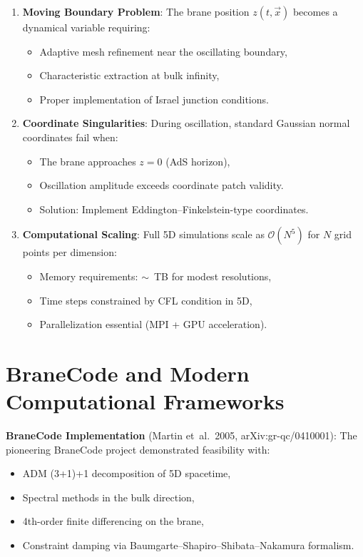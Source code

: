 \begin{enumerate}
  \item \textbf{Moving Boundary Problem}: The brane position $z(t,\vec{x})$ becomes a dynamical variable requiring:
  \begin{itemize}
    \item Adaptive mesh refinement near the oscillating boundary,
    \item Characteristic extraction at bulk infinity,
    \item Proper implementation of Israel junction conditions.
  \end{itemize}

  \item \textbf{Coordinate Singularities}: During oscillation, standard Gaussian normal coordinates fail when:
  \begin{itemize}
    \item The brane approaches $z = 0$ (AdS horizon),
    \item Oscillation amplitude exceeds coordinate patch validity.
    \item Solution: Implement Eddington--Finkelstein-type coordinates.
  \end{itemize}

  \item \textbf{Computational Scaling}: Full 5D simulations scale as $\mathcal{O}(N^5)$ for $N$ grid points per dimension:
  \begin{itemize}
    \item Memory requirements: $\sim$~TB for modest resolutions,
    \item Time steps constrained by CFL condition in 5D,
    \item Parallelization essential (MPI + GPU acceleration).
  \end{itemize}
\end{enumerate}

\section{BraneCode and Modern Computational Frameworks}
\label{sec:branecode}

\textbf{BraneCode Implementation} (Martin et~al.\ 2005, arXiv:gr-qc/0410001): The pioneering BraneCode project demonstrated feasibility with:
\begin{itemize}
  \item ADM (3+1)+1 decomposition of 5D spacetime,
  \item Spectral methods in the bulk direction,
  \item 4th-order finite differencing on the brane,
  \item Constraint damping via Baumgarte--Shapiro--Shibata--Nakamura formalism.
\end{itemize}

